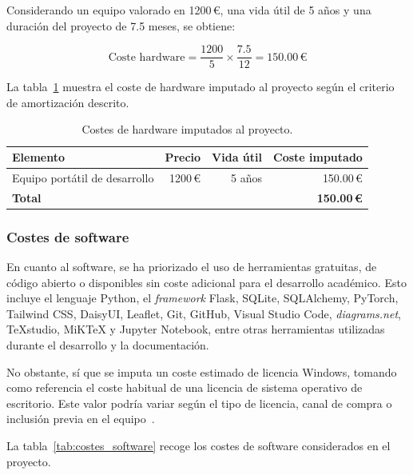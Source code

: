 Considerando un equipo valorado en \num{1200}\,€, una vida útil de \num{5} años y una duración del proyecto de \num{7.5} meses, se obtiene:

\begin{equation}
	\text{Coste hardware} =
	\frac{\num{1200}}{\num{5}} \times \frac{\num{7.5}}{\num{12}}
	= \num{150.00}\,\text{€}
\end{equation}

La tabla~\ref{tab:costes_hardware} muestra el coste de hardware imputado al proyecto según el criterio de amortización descrito.

\begin{table}[]
	\centering
	\renewcommand{\arraystretch}{1.25}
	\begin{tabular}{l r r r}
		\toprule
		\textbf{Elemento} & \textbf{Precio} & \textbf{Vida útil} & \textbf{Coste imputado} \\
		\midrule
		Equipo portátil de desarrollo & \num{1200}\,€ & \num{5} años & \num{150.00}\,€ \\
		\midrule
		\textbf{Total} & & & \textbf{\num{150.00}\,€} \\
		\bottomrule
	\end{tabular}
	\caption{Costes de hardware imputados al proyecto.}
	\label{tab:costes_hardware}
\end{table}

\subsubsection{Costes de software}

En cuanto al software, se ha priorizado el uso de herramientas gratuitas, de código abierto o disponibles sin coste adicional para el desarrollo académico. Esto incluye el lenguaje Python, el \textit{framework} Flask, SQLite, SQLAlchemy, PyTorch, Tailwind CSS, DaisyUI, Leaflet, Git, GitHub, Visual Studio Code, \textit{diagrams.net}, TeXstudio, MiKTeX y Jupyter Notebook, entre otras herramientas utilizadas durante el desarrollo y la documentación.

No obstante, sí que se imputa un coste estimado de licencia Windows, tomando como referencia el coste habitual de una licencia de sistema operativo de escritorio. Este valor podría variar según el tipo de licencia, canal de compra o inclusión previa en el equipo~\cite{xataka_windows10_licencias_precios_2020}.

La tabla~\ref{tab:costes_software} recoge los costes de software considerados en el proyecto.

